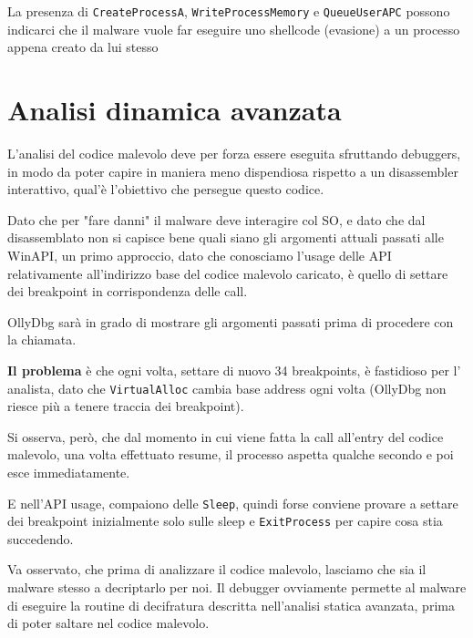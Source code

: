 \documentclass[
    a4paper, %
    11pt %
]{article}
\begin{document}
            La presenza di \texttt{CreateProcessA}, \texttt{WriteProcessMemory} e \texttt{QueueUserAPC}
            possono indicarci che il malware vuole far eseguire uno shellcode (evasione) a un processo
            appena creato da lui stesso

            \section{Analisi dinamica avanzata}

            L'analisi del codice malevolo deve per forza essere eseguita sfruttando debuggers, in modo
            da poter capire in maniera meno dispendiosa rispetto a un disassembler interattivo, qual'è
            l'obiettivo che persegue questo codice.

            Dato che per "fare danni" il malware deve interagire col SO, e dato che dal disassemblato
            non si capisce bene quali siano gli argomenti attuali passati alle WinAPI, un primo approccio, 
            dato che conosciamo l'usage delle API relativamente all'indirizzo base del codice malevolo 
            caricato, è quello di settare dei breakpoint in corrispondenza delle call. 
            
            OllyDbg sarà in grado di mostrare gli argomenti passati prima di procedere con la chiamata.

            \textbf{Il problema} è che ogni volta, settare di nuovo 34 breakpoints, è fastidioso per l'
            analista, dato che \texttt{VirtualAlloc} cambia base address ogni volta (OllyDbg non riesce 
            più a tenere traccia dei breakpoint).

            Si osserva, però, che dal momento in cui viene fatta la call all'entry del codice malevolo,
            una volta effettuato resume, il processo aspetta qualche secondo e poi esce immediatamente.

            E nell'API usage, compaiono delle \texttt{Sleep}, quindi forse conviene provare a settare
            dei breakpoint inizialmente solo sulle sleep e \texttt{ExitProcess} per capire cosa stia
            succedendo.

            Va osservato, che prima di analizzare il codice malevolo, lasciamo che sia il malware stesso
            a decriptarlo per noi. Il debugger ovviamente permette al malware di eseguire
            la routine di decifratura descritta nell'analisi statica avanzata, prima di poter saltare nel
            codice malevolo.
\end{document}
